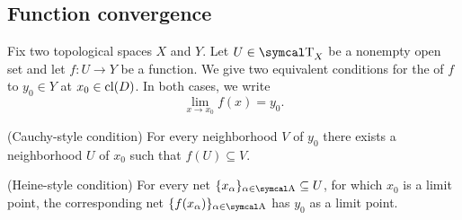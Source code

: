 \subsection{Function convergence}\label{subsec:function_convergence}

\begin{definition}\label{def:convergence_of_function_at_point}
  Fix two topological spaces \( X \) and \( Y \). Let \( U \in \CT_X \) be a nonempty open set and let \( f: U \to Y \) be a function. We give two equivalent conditions for the  of \( f \) to \( y_0 \in Y \) at \( x_0 \in \operatorname{cl}(D) \). In both cases, we write
  \begin{equation*}
    \lim_{x \to x_0} f(x) = y_0.
  \end{equation*}

  \begin{defenum}
    (Cauchy-style condition) For every neighborhood \( V \) of \( y_0 \) there exists a neighborhood \( U \) of \( x_0 \) such that \( f(U) \subseteq V \).

    (Heine-style condition) For every net \( \{ x_\al \}_{\al \in \CA} \subseteq U \), for which \( x_0 \) is a limit point, the corresponding net \( \{ f(x_\al) \}_{\al \in \CA} \) has \( y_0 \) as a limit point.
  \end{defenum}
\end{definition}

